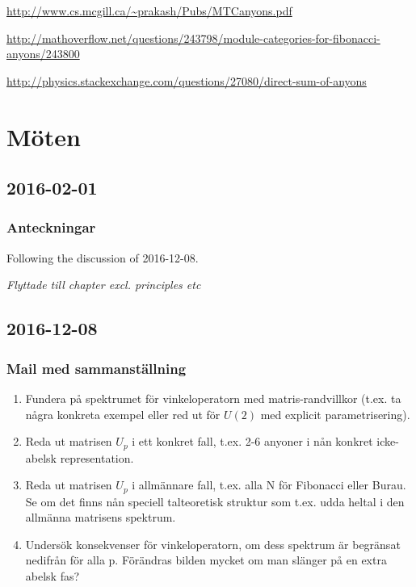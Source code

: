 \documentclass[a4paper,10pt,oneside]{book}
\theoremstyle{plain}
\theoremstyle{definition}
\theoremstyle{remark}
\begin{document}
{\begin{itemize}
    \url{http://www.cs.mcgill.ca/~prakash/Pubs/MTCanyons.pdf}

    \url{http://mathoverflow.net/questions/243798/module-categories-for-fibonacci-anyons/243800}

    \url{http://physics.stackexchange.com/questions/27080/direct-sum-of-anyons}
\end{itemize}


\chapter{Möten}

\section{2016-02-01}

\subsection{Anteckningar}

Following the discussion of 2016-12-08.

\emph{Flyttade till chapter excl. principles etc}

\section{2016-12-08}

\subsection{Mail med sammanställning}

\begin{enumerate}
  \item Fundera på spektrumet för vinkeloperatorn med matris-randvillkor (t.ex. ta några konkreta exempel eller red ut för $U(2)$ med explicit parametrisering).
  \item Reda ut matrisen $U_p$ i ett konkret fall, t.ex. 2-6 anyoner i nån konkret icke-abelsk representation.
  \item Reda ut matrisen $U_p$ i allmännare fall, t.ex. alla N för Fibonacci eller Burau. Se om det finns nån speciell talteoretisk struktur som t.ex. udda heltal i den allmänna matrisens spektrum.
  \item Undersök konsekvenser för vinkeloperatorn, om dess spektrum är begränsat nedifrån för alla p. Förändras bilden mycket om man slänger på en extra abelsk fas?
\end{enumerate}

}
\end{document}
